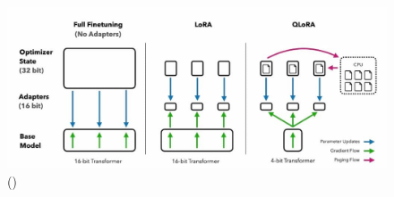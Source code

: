 \begin{figure}[H]
    \begin{center}
      \includegraphics[width=12cm]{figuras/Capitulo_09/QLoRa.jpg}
    \end{center}
    \caption[]{(\cite{DettmersTim2023QEFo})}
    \label{fig:qlora}
\end{figure}\


